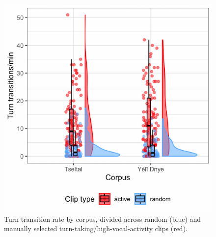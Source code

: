 \documentclass[10pt, letterpaper]{article}
\newenvironment{CodeChunk}{}{}
\begin{document}
\begin{CodeChunk}
\begin{figure}[h]

{\centering \includegraphics{figs/tseyel.ttr.fig-1} 

}

\caption[Turn transition rate by corpus, divided across random (blue) and manually selected turn-taking/high-vocal-activity clips (red)]{Turn transition rate by corpus, divided across random (blue) and manually selected turn-taking/high-vocal-activity clips (red).}\label{fig:tseyel.ttr.fig}
\end{figure}
\end{CodeChunk}
\end{document}
